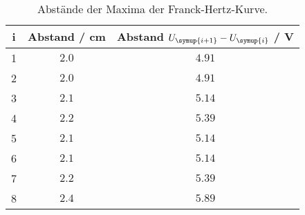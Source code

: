 \begin{table}[!htp]
\centering
\caption{Abstände der Maxima der Franck-Hertz-Kurve.}
\label{tab:franck}
\begin{tabular}{c c c}
\toprule
{i} & {Abstand / cm} & { Abstand $U_{\symup{i+1}} - U_{\symup{i}}$ / V} \\
\midrule
1 & $2.0$ & $4.91$ \\
2 & $2.0$ & $4.91$ \\
3 & $2.1$ & $5.14$ \\
4 & $2.2$ & $5.39$ \\
5 & $2.1$ & $5.14$ \\
6 & $2.1$ & $5.14$ \\
7 & $2.2$ & $5.39$ \\
8 & $2.4$ & $5.89$ \\
\bottomrule
\end{tabular}
\end{table}